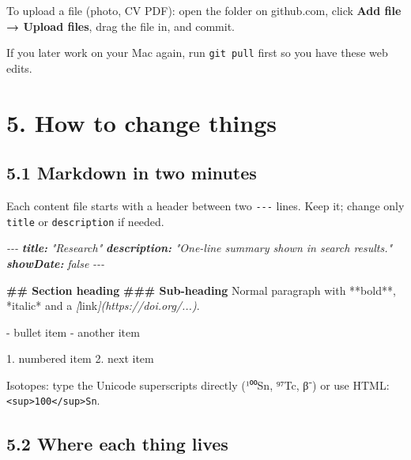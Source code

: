 \documentclass[
  10pt,
]{article}
\newenvironment{Shaded}{\begin{snugshade}}{\end{snugshade}}
\newcommand{\AnnotationTok}[1]{\textcolor[rgb]{0.56,0.35,0.01}{\textbf{\textit{#1}}}}
\newcommand{\CommentTok}[1]{\textcolor[rgb]{0.56,0.35,0.01}{\textit{#1}}}
\newcommand{\FunctionTok}[1]{\textcolor[rgb]{0.13,0.29,0.53}{\textbf{#1}}}
\newcommand{\NormalTok}[1]{#1}
\newcommand{\OtherTok}[1]{\textcolor[rgb]{0.56,0.35,0.01}{#1}}
\newcommand{\SpecialStringTok}[1]{\textcolor[rgb]{0.31,0.60,0.02}{#1}}
\begin{document}
To upload a file (photo, CV PDF): open the folder on github.com, click
\textbf{Add file → Upload files}, drag the file in, and commit.

If you later work on your Mac again, run \texttt{git\ pull} first so you
have these web edits.

\hypertarget{how-to-change-things}{%
\section{5. How to change things}\label{how-to-change-things}}

\hypertarget{markdown-in-two-minutes}{%
\subsection{5.1 Markdown in two minutes}\label{markdown-in-two-minutes}}

Each content file starts with a header between two \texttt{-\/-\/-}
lines. Keep it; change only \texttt{title} or \texttt{description} if
needed.

\begin{Shaded}
\begin{Highlighting}[]
\CommentTok{{-}{-}{-}}
\AnnotationTok{title:}\CommentTok{ "Research"}
\AnnotationTok{description:}\CommentTok{ "One{-}line summary shown in search results."}
\AnnotationTok{showDate:}\CommentTok{ false}
\CommentTok{{-}{-}{-}}

\FunctionTok{\#\# Section heading}
\FunctionTok{\#\#\# Sub{-}heading}
\NormalTok{Normal paragraph with **bold**, *italic* and a }\CommentTok{[}\OtherTok{link}\CommentTok{](https://doi.org/...)}\NormalTok{.}

\SpecialStringTok{{-} }\NormalTok{bullet item}
\SpecialStringTok{{-} }\NormalTok{another item}

\SpecialStringTok{1. }\NormalTok{numbered item}
\SpecialStringTok{2. }\NormalTok{next item}
\end{Highlighting}
\end{Shaded}

Isotopes: type the Unicode superscripts directly (¹⁰⁰Sn, ⁹⁷Tc, β⁻) or
use HTML:
\texttt{\textless{}sup\textgreater{}100\textless{}/sup\textgreater{}Sn}.

\hypertarget{where-each-thing-lives}{%
\subsection{5.2 Where each thing lives}\label{where-each-thing-lives}}
\end{document}
